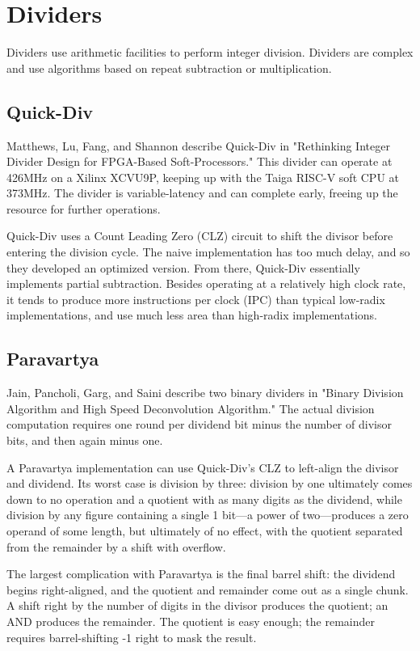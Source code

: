 \chapter{Dividers}
Dividers use arithmetic facilities to perform integer division.  Dividers are
complex and use algorithms based on repeat subtraction or multiplication.

\section{Quick-Div}
Matthews, Lu, Fang, and Shannon describe Quick-Div in "Rethinking Integer
Divider Design for FPGA-Based Soft-Processors."  This divider can operate at
426MHz on a Xilinx XCVU9P, keeping up with the Taiga RISC-V soft CPU at 373MHz.
The divider is variable-latency and can complete early, freeing up the resource
for further operations.

Quick-Div uses a Count Leading Zero (CLZ) circuit to shift the divisor before
entering the division cycle.  The naive implementation has too much delay, and
so they developed an optimized version.  From there, Quick-Div essentially
implements partial subtraction.  Besides operating at a relatively high clock
rate, it tends to produce more instructions per clock (IPC) than typical
low-radix implementations, and use much less area than high-radix
implementations.

\section{Paravartya}

Jain, Pancholi, Garg, and Saini describe two binary dividers in "Binary
Division Algorithm and High Speed Deconvolution Algorithm." The actual division
computation requires one round per dividend bit minus the number of divisor
bits, and then again minus one.

A Paravartya implementation can use Quick-Div's CLZ to left-align the divisor
and dividend.  Its worst case is division by three:  division by one ultimately
comes down to no operation and a quotient with as many digits as the dividend,
while division by any figure containing a single 1 bit—a power of two—produces
a zero operand of some length, but ultimately of no effect, with the quotient
separated from the remainder by a shift with overflow.

The largest complication with Paravartya is the final barrel shift:  the
dividend begins right-aligned, and the quotient and remainder come out as a
single chunk.  A shift right by the number of digits in the divisor produces
the quotient; an AND produces the remainder.  The quotient is easy enough; the
remainder requires barrel-shifting -1 right to mask the result.
